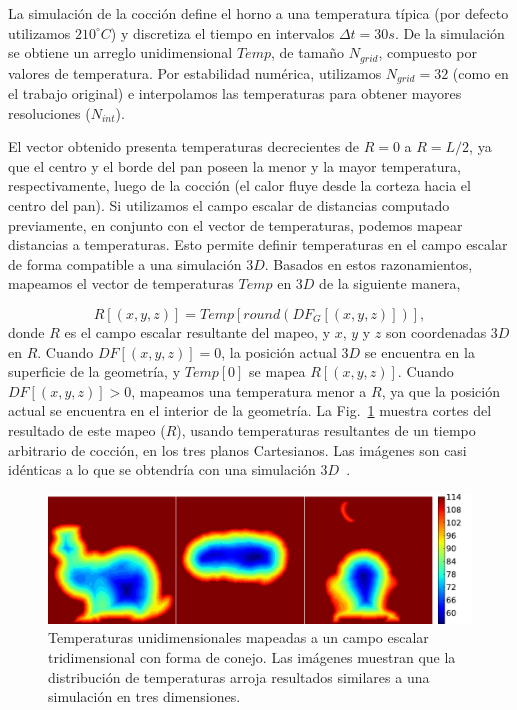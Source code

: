 La simulación de la cocción define el horno a una temperatura típica (por defecto utilizamos $210^{\circ}C$) y discretiza el tiempo en intervalos $\Delta t = 30s$.
De la simulación se obtiene un arreglo unidimensional $Temp$, de tamaño $N_{grid}$, compuesto por valores de temperatura.
Por estabilidad numérica, utilizamos $N_{grid}=32$ (como en el trabajo original) e interpolamos las temperaturas para obtener mayores resoluciones ($N_{int}$). 

El vector obtenido presenta temperaturas decrecientes de $R = 0$ a $R = L/2$, ya que el centro y el borde del pan poseen la menor y la mayor temperatura, respectivamente, luego de la cocción (el calor fluye desde la corteza hacia el centro del pan). 
Si utilizamos el campo escalar de distancias computado previamente, en conjunto con el vector de temperaturas, podemos mapear distancias a temperaturas.
Esto permite definir temperaturas en el campo escalar de forma compatible a una simulación $3D$.
Basados en estos razonamientos, mapeamos el vector de temperaturas $Temp$ en $3D$ de la siguiente manera,

\begin{equation*}
\displaystyle R[(x,y,z)] = Temp[ round( DF_{G}[(x,y,z)] ) ], 
\end{equation*}
%
donde $R$ es el campo escalar resultante del mapeo, y $x$, $y$ y $z$ son coordenadas $3D$ en $R$. Cuando $DF[(x,y,z)] = 0$, la posición actual $3D$ se encuentra en la superficie de la geometría, y $Temp[0]$ se mapea $R[(x,y,z)]$.
Cuando $DF[(x,y,z)] > 0$, mapeamos una temperatura menor a $R$, ya que la posición actual se encuentra en el interior de la geometría.
La Fig.~\ref{fg:baking} muestra cortes del resultado de este mapeo ($R$), usando temperaturas resultantes de un tiempo arbitrario de cocción, en los tres planos Cartesianos. 
Las imágenes son casi idénticas a lo que se obtendría con una simulación $3D$~\cite{Purlis2010}.

\begin{figure}
\includegraphics[width=13cm]{figures/tempsbunny}
\caption[Temperaturas unidimensionales mapeadas a un campo escalar tridimensional con forma de conejo]{Temperaturas unidimensionales mapeadas a un campo escalar tridimensional con forma de conejo. Las imágenes muestran que la distribución de temperaturas arroja resultados similares a una simulación en tres dimensiones.}
\label{fg:baking}
\end{figure}

